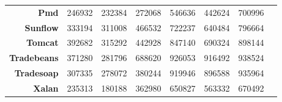 \begin{sidewaystable}
\begin{tabular}{rrcccccc}
    \textbf{Pmd}        & 246932           & 232384       & 272068       & 546636           & 442624       & 700996       \\
    \textbf{Sunflow}    & 333194           & 311008       & 466532       & 722237           & 640484       & 796664       \\
    \textbf{Tomcat}     & 392682           & 315292       & 442928       & 847140           & 690324       & 898144       \\
    \textbf{Tradebeans} & 371280           & 281796       & 688620       & 926053           & 916492       & 938524       \\
    \textbf{Tradesoap}  & 307335           & 278072       & 380244       & 919946           & 896588       & 935964       \\
    \textbf{Xalan}      & 235313           & 180188       & 362980       & 650827           & 563332       & 670492      
  \end{tabular}
\end{sidewaystable}